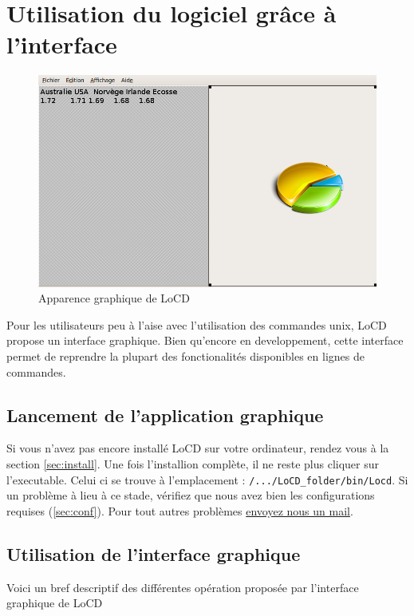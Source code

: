 \chapter{Utilisation du logiciel grâce à l'interface}\label{chap:usegraph}
  \begin{figure}[htbp]
    \centering
    \includegraphics[scale=0.40]{img/soft}
    \caption{Apparence graphique de LoCD}
    \label{fig:apgraph}
  \end{figure}
Pour les utilisateurs peu à l'aise avec l'utilisation des commandes unix, LoCD propose un interface graphique. Bien qu'encore en developpement, cette interface permet de reprendre la plupart des fonctionalités disponibles en lignes de commandes. 


\section{Lancement de l'application graphique}
\label{sec:lancegraph}
Si vous n'avez pas encore installé LoCD sur votre ordinateur, rendez vous à la section \ref{sec:install}. Une fois l'installion complète, il ne reste plus cliquer sur l'executable. Celui ci se trouve à l'emplacement : \verb+/.../LoCD_folder/bin/Locd+. Si un problème à lieu à ce stade, vérifiez que nous avez bien les configurations requises (\ref{sec:conf}). Pour tout autres problèmes \href{mailto:LoCD_assistance@exemple.com}{envoyez nous un mail}.

\section{Utilisation de l'interface graphique}
Voici un bref descriptif des différentes opération proposée par l'interface graphique de LoCD
